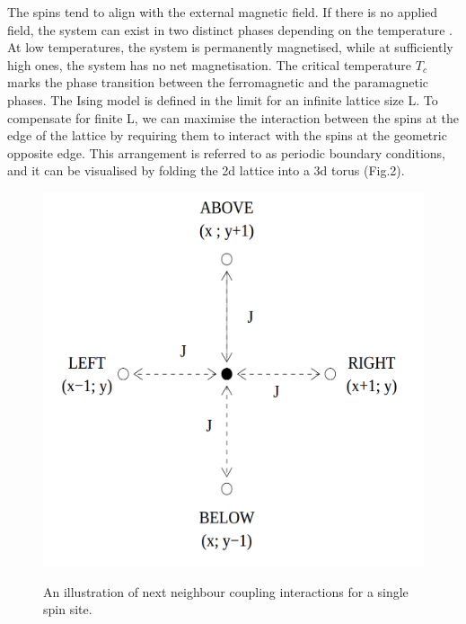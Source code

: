 \documentclass[a4paper]{article}
\begin{document}
The spins tend to align with the external magnetic field. If there is no applied field, the system can exist in two distinct phases depending on the temperature \cite{stat}. At low temperatures, the system is permanently magnetised, while at sufficiently high ones, the system has no net magnetisation. The critical temperature $T_c$ marks the phase transition between the ferromagnetic and the paramagnetic phases. The Ising model is defined in the limit for an infinite lattice size L. To compensate for finite L, we can maximise the interaction between the spins at the edge of the lattice by requiring them to interact with the spins at the geometric opposite edge. This arrangement is referred to as periodic boundary conditions, and it can be visualised by folding the 2d lattice into a 3d torus (Fig.2).


\begin{figure}[h]
\centering
\begin{minipage}[b]{0.3\linewidth}
\includegraphics[width=1\textwidth]{neighbour.png}
\label{fig:minipage1}
\caption{An illustration of next neighbour coupling interactions for a single spin site.}
\end{minipage}
\hspace{1.85cm}
\quad
\begin{minipage}[b]{0.4\linewidth}

\end{minipage}
\end{figure}
\end{document}
